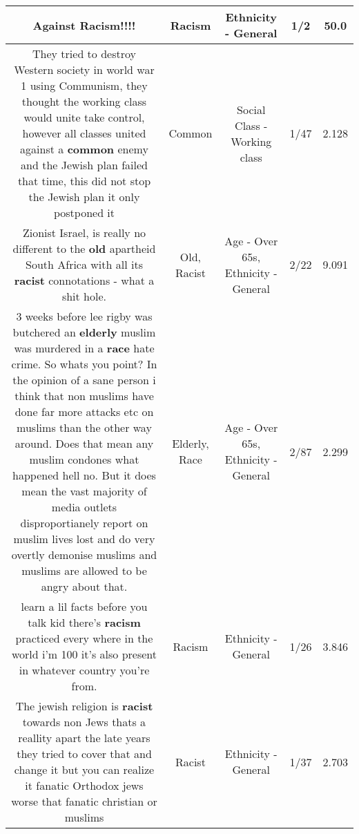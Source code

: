 \documentclass[11pt]{article}
\newlength\mylength
\begin{document}
\begin{center}
\begin{longtable}{|C{.65\mylength}|C{.30\mylength}|C{.12\mylength}|C{.12\mylength}|C{.12\mylength}|}
  \small Against \textbf{Racism}!!!!\normalsize   & Racism & Ethnicity - General & 1/2 & 50.0 \\  \hline
  \small They tried to destroy Western society in world war 1 using Communism, they thought the working class would unite take control, however all classes united against a \textbf{common} enemy and the Jewish plan failed that time, this did not stop the Jewish plan it only postponed it\normalsize   & Common & Social Class - Working class & 1/47 & 2.128 \\  \hline
  \small Zionist Israel, is really no different to the \textbf{old} apartheid South Africa with all its \textbf{racist} connotations - what a shit hole.\normalsize   & Old, Racist & Age - Over 65s, Ethnicity - General & 2/22 & 9.091 \\  \hline
  \small 3 weeks before lee rigby was butchered an \textbf{elderly} muslim  was murdered in a \textbf{race} hate crime. So whats you point? In the opinion of a sane person i think that non muslims have done far more attacks etc on muslims than the other way around. Does that mean any muslim condones what happened hell no. But it does mean the vast majority of media outlets disproportianely report on muslim lives lost and do very overtly demonise muslims and muslims are allowed to be angry about that.\normalsize   & Elderly, Race & Age - Over 65s, Ethnicity - General & 2/87 & 2.299 \\  \hline
  \small learn a lil facts before you talk kid there's \textbf{racism} practiced every where in the world i'm 100 it's also present in whatever country you're from.\normalsize   & Racism & Ethnicity - General & 1/26 & 3.846 \\  \hline
  \small Τhe jewish religion is \textbf{racist} towards non Jews   thats a reallity apart the late years they tried to cover that and change it but you can realize it fanatic Orthodox jews worse that fanatic christian or muslims\normalsize   & Racist & Ethnicity - General & 1/37 & 2.703 \\  \hline

\end{longtable}
\end{center}
\end{document}
